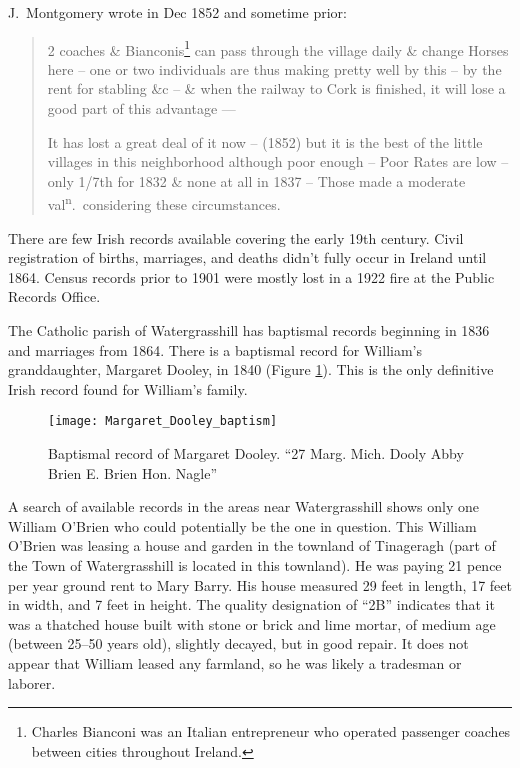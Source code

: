 J.\ Montgomery wrote in Dec 1852 and sometime prior:

\begin{quote}
	2 coaches \& Bianconis\footnote{Charles Bianconi was an Italian entrepreneur who operated passenger coaches between cities throughout Ireland.} can pass through the village daily \& change Horses here -- one or two individuals are thus making pretty well by this -- by the rent for stabling \&c -- \& when the railway to Cork is finished, it will lose a good part of this advantage ---
	
	It has lost a great deal of it now -- (1852) but it is the best of the little villages in this neighborhood although poor enough -- Poor Rates are low -- only 1/7th for 1832 \& none at all in 1837 -- Those made a moderate val\textsuperscript{n}.\ considering these circumstances.\cite{HouseIntro:2}
\end{quote}

There are few Irish records available covering the early 19th century. Civil registration of births, marriages, and deaths didn't fully occur in Ireland until 1864.\cite{Grenham:1} Census records prior to 1901 were mostly lost in a 1922 fire at the Public Records Office.\cite{Grenham:18} 

The Catholic parish of Watergrasshill has baptismal records beginning in 1836 and marriages from 1864.\cite{ParishRecords} There is a baptismal record for William's granddaughter, Margaret Dooley, in 1840 (Figure \ref{fig:DooleyBaptism}). This is the only definitive Irish record found for William's family.\cite{Margaret3DooleyBaptism2}

\begin{figure}[htbp]
	\centering
	\texttt{[image: Margaret\_Dooley\_baptism]}
	\caption{Baptismal record of Margaret Dooley. ``27 Marg. Mich. Dooly Abby Brien E. Brien Hon. Nagle''}
	\label{fig:DooleyBaptism}
\end{figure}

A search of available records in the areas near Watergrasshill shows only one William O'Brien who could potentially be the one in question. This William O'Brien was leasing a house and garden in the townland of Tinageragh (part of the Town of Watergrasshill is located in this townland). He was paying 21 pence per year ground rent to Mary Barry.\cite{TenureBook1847:1} His house measured 29 feet in length, 17 feet in width, and 7 feet in height.\cite{HouseBook1849} The quality designation of ``2B'' indicates that it was a thatched house built with stone or brick and lime mortar, of medium age (between 25--50 years old), slightly decayed, but in good repair. It does not appear that William leased any farmland, so he was likely a tradesman or laborer.\cite{WilliamOBrienSearch:1} 

